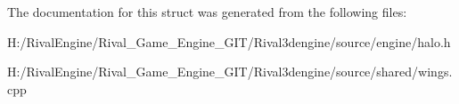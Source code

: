 The documentation for this struct was generated from the following files\+:\begin{DoxyCompactItemize}
\item 
H\+:/\+Rival\+Engine/\+Rival\+\_\+\+Game\+\_\+\+Engine\+\_\+\+G\+I\+T/\+Rival3dengine/source/engine/halo.\+h\item 
H\+:/\+Rival\+Engine/\+Rival\+\_\+\+Game\+\_\+\+Engine\+\_\+\+G\+I\+T/\+Rival3dengine/source/shared/wings.\+cpp\end{DoxyCompactItemize}

